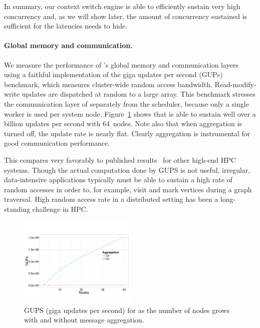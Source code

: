In summary, our context switch engine is able to efficiently sustain very high
concurrency and, as we will show later, the amount of concurrency sustained is
sufficient for the latencies \Grappa needs to hide.

\paragraph{Global memory and communication.} We measure the performance of
\Grappa's global memory and communication layers using a faithful
implementation of the giga updates per second (GUPs) benchmark, which
measures cluster-wide random access bandwidth.  Read-modify-write
updates are dispatched at random to a large array. This benchmark
stresses the communication layer of \Grappa separately from the
scheduler, because only a single worker is used per system node.
Figure~\ref{fig:grappa-gups} shows that \Grappa is able to sustain
well over a billion updates per second with 64~nodes. Note also that
when aggregation is turned off, the update rate is nearly
flat. Clearly aggregation is instrumental for good communication
performance.

This compares very favorably to published results~\cite{gups} for other
high-end HPC systems. Though the actual computation done by GUPS is not 
useful, irregular, data-intensive applications typically must be able to
sustain a high rate of random accesses in order to, for example, visit and
mark vertices during a graph traversal. High random access rate in a
distributed setting has been a long-standing challenge in HPC.

\begin{figure}[ht]
    \begin{center}
      \includegraphics[width=0.5\textwidth]{figs/gups.pdf}
    \end{center}
    \caption{GUPS (giga updates per second) for \Grappa as the number of nodes grows with and without message aggregation.}
    \label{fig:grappa-gups}
\end{figure}


